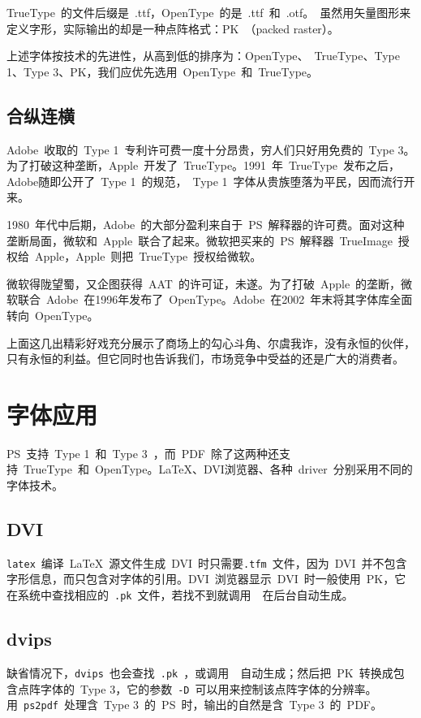 TrueType~的文件后缀是~.ttf，OpenType~的是~.ttf~和~.otf。\MF~虽然用矢量图形来定义字形，实际输出的却是一种点阵格式：PK~（packed raster）。

上述字体按技术的先进性，从高到低的排序为：OpenType、~TrueType、Type 1、Type 3、PK，我们应优先选用~OpenType~和~TrueType。

\subsection{合纵连横}
Adobe~收取的~Type 1~专利许可费一度十分昂贵，穷人们只好用免费的~Type 3。为了打破这种垄断，Apple~开发了~TrueType。1991~年~TrueType~发布之后，Adobe随即公开了~Type 1~的规范，~Type 1~字体从贵族堕落为平民，因而流行开来。

1980~年代中后期，Adobe~的大部分盈利来自于~PS~解释器的许可费。面对这种垄断局面，微软和~Apple~联合了起来。微软把买来的~PS~解释器~TrueImage~授权给~Apple，Apple~则把~TrueType~授权给微软。

微软得陇望蜀，又企图获得~AAT~的许可证，未遂。为了打破~Apple~的垄断，微软联合~Adobe~在1996年发布了~OpenType。Adobe~在2002~年末将其字体库全面转向~OpenType。

上面这几出精彩好戏充分展示了商场上的勾心斗角、尔虞我诈，没有永恒的伙伴，只有永恒的利益。但它同时也告诉我们，市场竞争中受益的还是广大的消费者。

\section{字体应用}

PS~支持~Type 1~和~Type 3~，而~PDF~除了这两种还支持~TrueType~和~OpenType。\LaTeX{}、DVI浏览器、各种~driver~分别采用不同的字体技术。

\subsection{DVI}
\verb|latex|~编译~\LaTeX{}~源文件生成~DVI~时只需要\verb|.tfm|~文件，因为~DVI~并不包含字形信息，而只包含对字体的引用。DVI~浏览器显示~DVI~时一般使用~PK，它在系统中查找相应的~\verb|.pk|~文件，若找不到就调用~\MF~在后台自动生成。

\subsection{dvips}
缺省情况下，\verb|dvips|~也会查找~\verb|.pk|~，或调用~\MF~自动生成；然后把~PK~转换成包含点阵字体的~Type 3，它的参数~\verb|-D|~可以用来控制该点阵字体的分辨率。用~\verb|ps2pdf|~处理含~Type 3~的~PS~时，输出的自然是含~Type 3~的~PDF。

